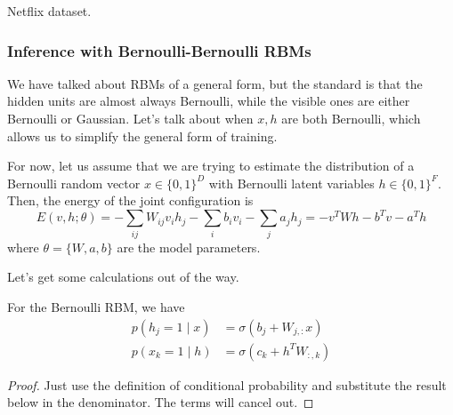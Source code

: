     \begin{example}
      Netflix dataset. 
    \end{example}

  \subsubsection{Inference with Bernoulli-Bernoulli RBMs}

    We have talked about RBMs of a general form, but the standard is that the hidden units are almost always Bernoulli, while the visible ones are either Bernoulli or Gaussian. Let's talk about when $x, h$ are both Bernoulli, which allows us to simplify the general form of training. 

    \begin{definition}
      For now, let us assume that we are trying to estimate the distribution of a Bernoulli random vector $x \in \{0, 1\}^D$ with Bernoulli latent variables $h \in \{0, 1\}^F$. Then, the energy of the joint configuration is  
      \begin{equation}
        E(v, h; \theta) = - \sum_{ij} W_{ij} v_i h_j - \sum_i b_i v_i - \sum_j a_j h_j = - v^T W h - b^T v - a^T h
      \end{equation}
      where $\theta = \{W, a, b\}$ are the model parameters. 
    \end{definition}

    Let's get some calculations out of the way. 

    \begin{lemma} 
      For the Bernoulli RBM, we have 
      \begin{align} 
        p(h_j = 1 \mid x) & = \sigma ( b_j + W_{j,:} x) \\
        p(x_k = 1 \mid h) & = \sigma ( c_k + h^T W_{:, k})
      \end{align}
    \end{lemma}
    \begin{proof}
      Just use the definition of conditional probability and substitute the result below in the denominator. The terms will cancel out. 
    \end{proof}

